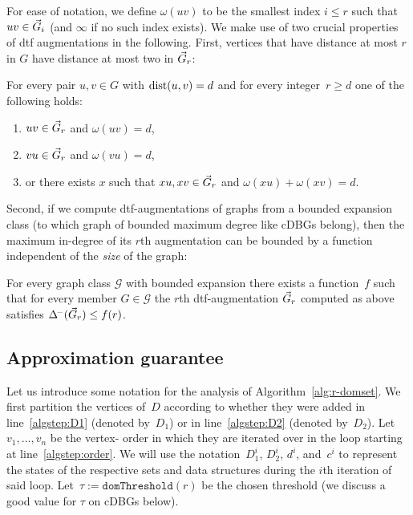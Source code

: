 For ease of notation, we define $\omega(uv)$ to be the
smallest index $i \leq r$ such that $uv \in \vec{G}_i$
(and $\infty$ if no such index exists).
We make use of two crucial properties of dtf augmentations 
in the following. First, vertices that have distance at most
$r$ in $G$ have distance at most two in $\vec{G}_r$:

\begin{lemma}
  For every pair $u,v \in G$ with $\text{dist}(u,v) = d$ and
  for every integer~$r \geq d$ one of the following holds:
  \begin{enumerate}
    \item $uv \in \vec{G}_r$ and $\omega(uv) = d$,
    \item $vu \in \vec{G}_r$ and $\omega(vu) = d$,
    \item or there exists $x$ such that $xu, xv \in \vec{G}_r$ and
          $\omega(xu) + \omega(xv) = d$.
  \end{enumerate}
\end{lemma}

\noindent
Second, if we compute dtf-augmentations of graphs from a bounded
expansion class (to which graph of bounded maximum degree like
cDBGs belong), then the maximum in-degree
of its $r$th augmentation can be bounded by a function independent
of the \emph{size} of the graph:

\begin{theorem}\label{thm:dtf}
  For every graph class $\mathcal G$ with bounded expansion there exists
  a function~$f$ such that for every member $G \in \mathcal G$
  the $r$th dtf-augmentation $\vec{G}_r$ computed as above
  satisfies
  $\Delta^{\!-}(\vec{G}_r) \leq f(r)$.
\end{theorem}

\subsection{Approximation guarantee}\label{app:threshold}

Let us introduce some notation for the analysis of
Algorithm~\ref{alg:r-domset}. We first partition the vertices of~$D$ according
to whether they were added in line~\ref{algstep:D1} (denoted by~$D_1$) or in
line~\ref{algstep:D2} (denoted by~$D_2$). Let~$v_1,\ldots,v_n$ be the vertex-
order in which they are iterated over in the loop starting at
line~\ref{algstep:order}. We will use the notation~$D_1^i$, $D_2^i$, $d^i$,
and~$c^i$ to represent the states of the respective sets and data structures
during the $i$th iteration of said loop. Let~$\tau :=
\texttt{domThreshold}(r)$ be the chosen threshold (we discuss a good value
for $\tau$ on cDBGs below).

